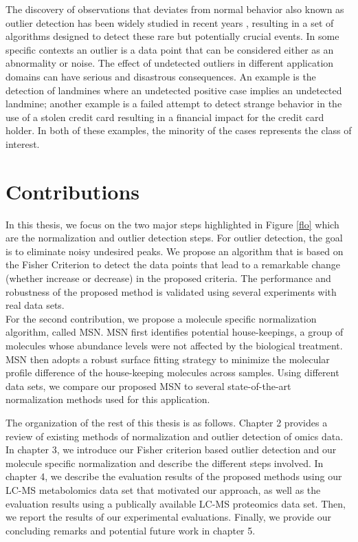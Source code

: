 The discovery of observations that deviates from normal behavior also known as outlier detection has
been widely studied in recent years \cite{outlier} \cite{outlier2}, resulting in a set of algorithms designed
to detect these rare but potentially crucial events. In some specific contexts an
outlier is a data point that can be considered either as an abnormality or noise.
The effect of undetected outliers in different application domains can have serious and disastrous
consequences. An example is the detection of landmines where an undetected
positive case implies an undetected landmine; another example is a failed attempt to
detect strange behavior in the use of a stolen credit card resulting in a financial
impact for the credit card holder. In both of these examples, the minority of the
cases represents the class of interest.

\section{Contributions}
 In this thesis, we focus on the two major steps highlighted in Figure \ref{flo} which are the normalization and outlier detection steps.
For outlier detection, the goal is to eliminate noisy undesired peaks.
We propose an algorithm that is based on the Fisher Criterion to detect the data points that lead to a remarkable change (whether increase or decrease) in the proposed criteria. The performance and robustness of the proposed method is validated using several experiments with real data sets.\\
\indent For the second contribution, we propose a molecule specific normalization algorithm, called MSN. MSN first identifies potential house-keepings, a group of molecules whose abundance levels were not affected by the biological treatment. MSN then adopts a robust surface fitting strategy to minimize the molecular profile difference of the house-keeping molecules across samples. Using different data sets, we compare our proposed MSN to several state-of-the-art normalization methods used for this application.

\indent The organization of the rest of this thesis is as follows. Chapter 2 provides a review of existing methods of normalization and outlier detection of omics data.
In chapter 3,  we  introduce our Fisher criterion based outlier detection and our molecule specific normalization and describe the different steps involved. In chapter 4, we describe the evaluation results of the proposed methods using our LC-MS metabolomics data set that motivated our approach, as well as the evaluation results using a publically available LC-MS proteomics data set. Then, we report the results of our experimental evaluations. Finally, we provide our concluding remarks and potential future work in chapter 5.
